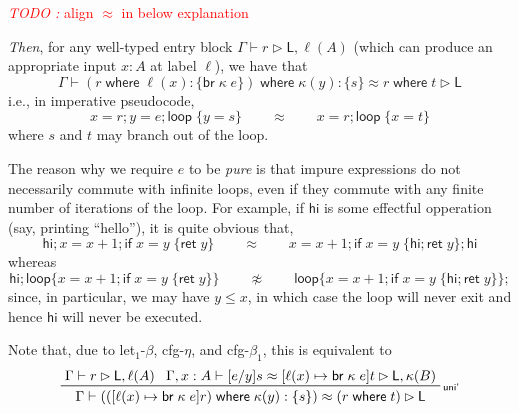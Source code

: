 \documentclass[acmsmall,screen,review]{acmart}
\newcounter{todos}
\newcommand{\TODO}[1]{{
  \stepcounter{todos}
  \begin{center}\large{\textcolor{red}{\emph{TODO \arabic{todos}:} #1}}\end{center}
}}
\newcommand{\ms}[1]{\ensuremath{\mathsf{#1}}}
\newcommand{\lto}{:}
\newcommand{\brb}[2]{\ms{br}\;#1\;#2}
\newcommand{\where}[2]{#1\;\ms{where}\;#2}
\newcommand{\wbranch}[3]{#1(#2) \lto \{#3\}}
\newcommand{\bhyp}[2]{#1 : #2}
\newcommand{\rle}[1]{{\scriptsize\textsf{#1}}}
\newcommand{\haslb}[3]{#1 \vdash #2 \rhd #3}
\newcommand{\teqv}{\approx}
\newcommand{\lbeq}[4]{#1 \vdash #2 \teqv #3 \rhd {#4}}
\newcommand{\brle}[1]{{\scriptsize\textsf{#1}}}
\begin{document}
\TODO{align $\teqv$ in below explanation}

\emph{Then}, for any well-typed entry block $\haslb{\Gamma}{r}{\ms{L}, \ell(A)}$ (which can produce
an appropriate input $x : A$ at label $\ell$), we have that
$$
  \lbeq{\Gamma}{\where{(\where{r}{\wbranch{\ell}{x}{\brb{\kappa}{e}}})}
    {\wbranch{\kappa}{y}{s}}}{\where{r}{t}}{\ms{L}}
$$
i.e., in imperative pseudocode,
$$
  x = r; y = e; \ms{loop}\;\{ y = s \} \qquad \teqv \qquad x = r; \ms{loop}\;\{ x = t \}
$$
where $s$ and $t$ may branch out of the loop.

The reason why we require $e$ to be \emph{pure} is that impure expressions do not necessarily
commute with infinite loops, even if they commute with any finite number of iterations of the loop.
For example, if $\ms{hi}$ is some effectful opperation (say, printing ``hello''), it is quite
obvious that,
$$
  \ms{hi} ; x = x + 1 ; \ms{if}\;x = y\;\{\ms{ret}\;y\}
  \qquad \teqv \qquad 
  x = x + 1 
  ; \ms{if}\;x = y\;\{\ms{hi} ; \ms{ret}\;y\} 
  ;  \ms{hi}
$$
whereas
$$
  \ms{hi} ; \ms{loop} \{ x = x + 1 ; \ms{if}\;x = y\;\{\ms{ret}\;y\} \} 
  \qquad \not\teqv \qquad 
  \ms{loop} \{ x = x + 1 ;  \ms{if}\;x = y\;\{\ms{hi} ; \ms{ret}\;y\} \} ;
$$
since, in particular, we may have $y \leq x$, in which case the loop will never exit and hence
$\ms{hi}$ will never be executed.

Note that, due to \brle{let$_1$-$\beta$}, \brle{cfg-$\eta$}, and \brle{cfg-$\beta_1$}, 
this is equivalent to
\begin{equation}
\prftree[r]{\rle{uni'}}
{
  \haslb{\Gamma}{r}{\ms{L}, \ell(A)}
}
{
  \lbeq{\Gamma, \bhyp{x}{A}}
    {[e/y]s}
    {[\ell(x) \mapsto \brb{\kappa}{e}]t}
    {\ms{L}, \kappa(B)}
}
{
  \lbeq{\Gamma}
    {(\where{([\ell(x) \mapsto \brb{\kappa}{e}]r)}{\wbranch{\kappa}{y}{s}})}
    {(\where{r}{t})}
    {\ms{L}}
}
\end{equation}
\end{document}
